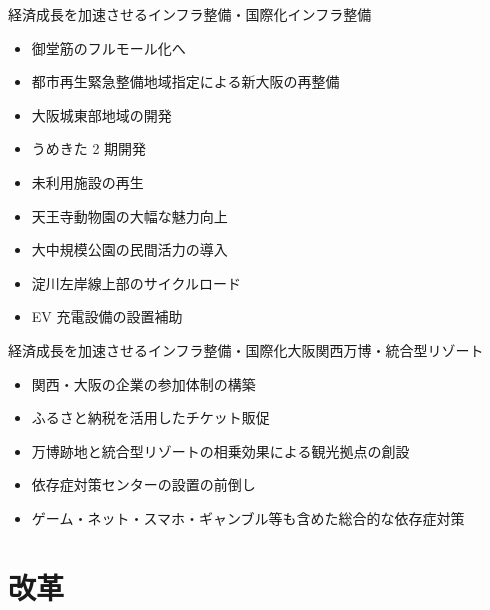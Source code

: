 \documentclass[dvipdfmx]{beamer}
\begin{document}
    \begin{frame}{経済成長を加速させるインフラ整備・国際化}{インフラ整備}
        \begin{small}
            \begin{itemize}
                \setlength{\itemsep}{2mm}
                \item 御堂筋のフルモール化へ
                \item 都市再生緊急整備地域指定による新大阪の再整備
                \item 大阪城東部地域の開発
                \item うめきた 2 期開発
                \item 未利用施設の再生
                \item 天王寺動物園の大幅な魅力向上
                \item 大中規模公園の民間活力の導入
                \item 淀川左岸線上部のサイクルロード
                \item \alert{EV 充電設備の設置補助}
            \end{itemize}
        \end{small}
    \end{frame}

    \begin{frame}{経済成長を加速させるインフラ整備・国際化}{大阪関西万博・統合型リゾート}
        \begin{small}
            \begin{itemize}
                \setlength{\itemsep}{2mm}
                \item 関西・大阪の企業の参加体制の構築
                \item ふるさと納税を活用したチケット販促
                \item 万博跡地と統合型リゾートの相乗効果による観光拠点の創設
                \item  依存症対策センターの設置の前倒し
                \item \alert{ゲーム・ネット・スマホ・ギャンブル等も含めた総合的な依存症対策}
            \end{itemize}
        \end{small}
    \end{frame}

\section{改革}
    \begin{frame}
        \sectionpage
    \end{frame}
\end{document}
